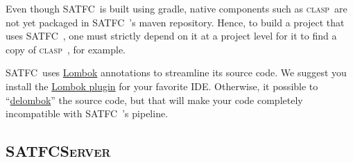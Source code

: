\documentclass[
10pt, %
letterpaper, %
oneside, %
headinclude,footinclude, %
BCOR5mm, %
needspace, %
]{scrartcl}
\newcommand{\SATFC}{\textsc{SATFC}~}
\newcommand{\SATFCServer}{\textsc{SATFCServer}~}
\newcommand{\clasp}{\textsc{clasp}~}
\begin{document}
Even though \SATFC is built using gradle, native components such as \clasp are not yet packaged in \SATFC's maven repository. Hence, to build a project that uses \SATFC, one must strictly depend on it at a project level for it to find a copy of \clasp, for example. 

\SATFC uses \href{http://projectlombok.org/}{Lombok} annotations to streamline its source code. We suggest you install the \href{http://projectlombok.org/download.html}{Lombok plugin} for your favorite IDE. Otherwise, it possible to ``\href{http://projectlombok.org/features/delombok.html}{delombok}'' the source code, but that will make your code completely incompatible with \SATFC's pipeline.


%



\subsection{\SATFCServer}
\end{document}
